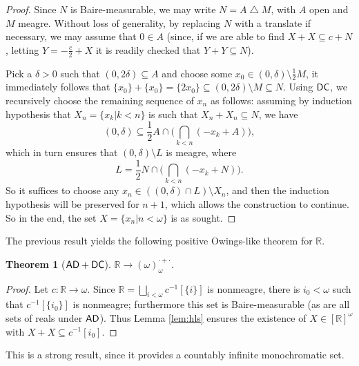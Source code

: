 \documentclass{amsart}
\newtheorem{theorem}{Theorem}[section]
\theoremstyle{definition}
\newcommand{\dc}{\mathnormal{\mathsf{DC}}}
\newcommand{\ad}{\mathnormal{\mathsf{AD}}}
\theoremstyle{remark}
\numberwithin{equation}{section}
\begin{document}
    \begin{proof}
    Since $N$ is Baire-measurable, we may write $N=A\bigtriangleup M$, with $A$ open and $M$ meagre. Without loss of generality, by replacing $N$ with a translate if necessary, we may assume that $0\in A$ (since, if we are able to find $X+X\subseteq c+N$, letting $Y=-\frac{c}{2}+X$ it is readily checked that $Y+Y\subseteq N$).

    Pick a $\delta>0$ such that $(0, 2\delta)\subseteq A$ and choose some $x_{0}\in(0,\delta)\setminus\frac{1}{2}M$, it immediately follows that $\{x_{0}\}+\{x_{0}\}=\{2x_{0}\}\subseteq(0, 2\delta)\setminus M\subseteq N$. Using $\dc$, we recursively choose the remaining sequence of $x_n$ as follows: assuming by induction hypothesis that $X_n=\{x_k\big|k<n\}$ is such that $X_{n}+X_{n}\subseteq N$, we have
    \begin{equation*}
        (0,\delta)\subseteq
    \frac{1}{2}A\cap\Big(\bigcap_{k<n}(-x_{k}+A)\Big),
    \end{equation*}
    which in turn ensures that $(0,\delta)\setminus L$ is meagre, where
    \begin{equation*}
        L=\frac{1}{2}N\cap\Big(\bigcap_{k<n}(-x_{k}+N)\Big). 
    \end{equation*}
    So it suffices to choose any $x_n\in((0,\delta)\cap L)\setminus X_{n}$, and then the induction hypothesis will be preserved for $n+1$, which allows the construction to continue. So in the end, the set $X=\{x_{n}\big|n<\omega\}$ is as sought.
    \end{proof}

The previous result yields the following positive Owings-like theorem for $\mathbb R$.

\begin{theorem}[$\ad+\dc$]\label{thm:R-owings-positive}
$\mathbb{R}\to(\omega)^{\cdot+\cdot}_{\omega}$.
\end{theorem}

    \begin{proof}
        Let $c:\mathbb{R}\to\omega$. Since $\mathbb{R}=\bigsqcup_{i<\omega}c^{-1}[\{i\}]$ is nonmeagre, there is $i_0<\omega$ such that $c^{-1}[\{i_0\}]$ is nonmeagre; furthermore this set is Baire-measurable (as are all sets of reals under $\ad$). Thus Lemma \ref{lem:hls} ensures the existence of $X\in[\mathbb{R}]^{\omega}$ with $X+X\subseteq c^{-1}[{i_0}]$.
    \end{proof}

This is a strong result, since it provides a countably infinite monochromatic set.
\end{document}

